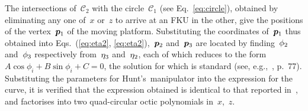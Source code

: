 \documentclass[DD]{iitmdiss}
\newcommand{\mref}[1]{\ref{#1}}
\newcommand{\mcite}[1]{\cite{#1}}
\begin{document}
The intersections of~$\mathcal{C}_2$ with the circle~$\mathcal{C}_1$ (see Eq.~\mref{eq:circle}), obtained by eliminating any one of~$x$ or~$z$ to arrive at an FKU in the other, give the positions of the vertex~$\bm{p}_1$ of the moving platform. Substituting the coordinates of~$\bm{p}_1$ thus obtained into Eqs.~(\mref{eq:eta2}, \mref{eq:eta2}),~$\bm{p}_2$ and~$\bm{p}_3$ are located by finding~$\phi_2$ and~$\phi_3$ respectively from~$\eta_3$ and~$\eta_2$, each of which reduces to the form~\mbox{$A \cos{\phi_i} + B \sin{\phi_i} + C = 0$}, the solution for which is standard (see, e.g.,~\mcite{ghosalbook}, p.~77). \\
Substituting the parameters for Hunt's~\rps manipulator into the expression for the curve, it is verified that the expression obtained is identical to that reported in~\mcite{tk2017a}, and factorises into two quad-circular octic polynomials in~$x$,~$z$.
%
\end{document}
